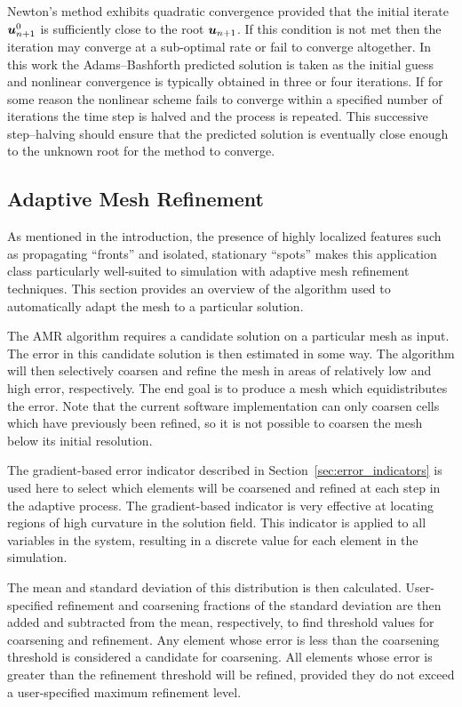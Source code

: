 Newton's method exhibits quadratic convergence provided that the initial iterate ${\boldsymbol{u}}_{n+1}^0$ is sufficiently close to the root ${\boldsymbol{u}}_{n+1}$.  If this condition is not met then the iteration may converge at a sub-optimal rate or fail to converge altogether.  In this work the Adams--Bashforth predicted solution is taken as the initial guess and nonlinear convergence is typically obtained in three or four iterations.  If for some reason the nonlinear scheme fails to converge within a specified number of iterations the time step is halved and the process is repeated.  This successive step--halving should ensure that the predicted solution is eventually close enough to the unknown root for the method to converge.



\subsection{Adaptive Mesh Refinement}
As mentioned in the introduction, the presence of highly localized features such as propagating ``fronts'' and isolated, stationary ``spots'' makes this application class particularly well-suited to simulation with adaptive mesh refinement  techniques.  This section provides an overview of the algorithm used to automatically adapt the mesh to a particular solution.

The AMR algorithm requires a candidate solution on a particular mesh as input.  The error in this candidate solution is then estimated in some way.  The algorithm will then selectively coarsen and refine the mesh in areas of relatively low and high error, respectively.  The end goal is to produce a mesh which equidistributes the error.  Note that the current software implementation can only coarsen cells which have previously been refined, so it is not possible to coarsen the mesh below its initial resolution.

The gradient-based error indicator described in Section~\ref{sec:error_indicators} is used here to select which elements will be coarsened and refined at each step in the adaptive process.  The gradient-based indicator is very effective at locating regions of high curvature in the solution field.
This indicator is applied to all variables in the system, resulting in a discrete value for each element in the simulation.

The mean and standard deviation of this distribution is then calculated.  User-specified refinement and coarsening fractions of the standard deviation are then added and subtracted from the mean, respectively, to find threshold values for coarsening and refinement.  Any element whose error is less than the coarsening threshold is considered a candidate for coarsening.  All elements whose error is greater than the refinement threshold will be refined, provided they do not exceed a user-specified maximum refinement level.



